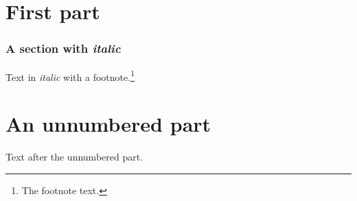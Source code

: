 \documentclass{article}
\begin{document}
\part{First part}
\section{A section with \emph{italic}}
Text in \emph{italic} with a footnote.\footnote{The footnote text.}
\part*{An unnumbered part}
Text after the unnumbered part.
\end{document}
